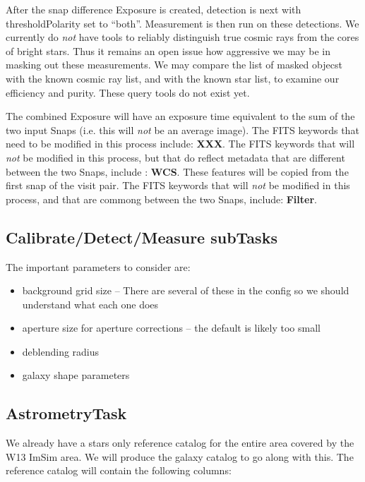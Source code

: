 \documentclass[12pt]{article}
\begin{document}
After the snap difference Exposure is created, detection is next with
thresholdPolarity set to ``both''.  Measurement is then run on these
detections.  We currently do {\it not} have tools to reliably
distinguish true cosmic rays from the cores of bright stars.  Thus it
remains an open issue how aggressive we may be in masking out these
measurements.  We may compare the list of masked objecst with the
known cosmic ray list, and with the known star list, to examine our
efficiency and purity.  These query tools do not exist yet.

The combined Exposure will have an exposure time equivalent to the sum
of the two input Snaps (i.e. this will {\it not} be an average image).
The FITS keywords that need to be modified in this process include:
{\bf XXX}.  The FITS keywords that will {\it not} be modified in this
process, but that do reflect metadata that are different between the
two Snaps, include : {\bf WCS}.  These features will be copied from
the first snap of the visit pair.  The FITS keywords that will {\it
  not} be modified in this process, and that are commong between the
two Snaps, include: {\bf Filter}.

\subsection{Calibrate/Detect/Measure subTasks}
The important parameters to consider are:
\begin{itemize} 
\item background grid size -- There are several of these in the config
  so we should understand what each one does
\item aperture size for aperture corrections -- the default is likely
  too small
\item deblending radius
\item galaxy shape parameters
\end{itemize}

\subsection{AstrometryTask} 

We already have a stars only reference catalog for the entire area
covered by the W13 ImSim area.  We will produce the galaxy catalog to
go along with this.  The reference catalog will contain the following
columns:
\end{document}
